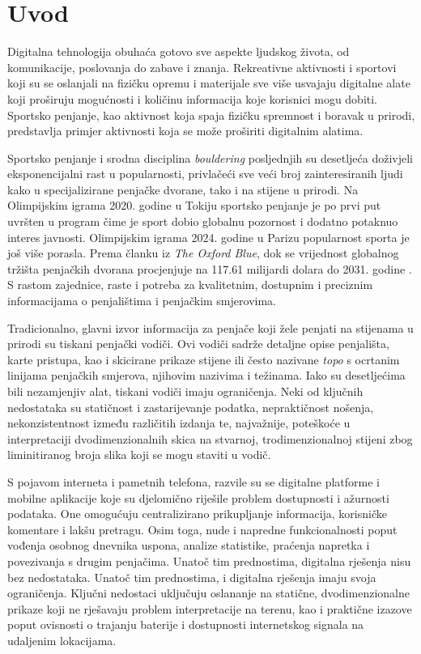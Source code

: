 \chapter{Uvod}

Digitalna tehnologija obuhaća gotovo sve aspekte ljudskog života, od komunikacije, poslovanja do zabave i znanja. Rekreativne aktivnosti i sportovi koji su se oslanjali na fizičku opremu i materijale sve više usvajaju digitalne alate koji proširuju mogućnosti i količinu informacija koje korisnici mogu dobiti. Sportsko penjanje, kao aktivnost koja spaja fizičku spremnost i boravak u prirodi, predstavlja primjer aktivnosti koja se može proširiti digitalnim alatima.

Sportsko penjanje i srodna disciplina \textit{bouldering} posljednjih su desetljeća doživjeli eksponencijalni rast u popularnosti, privlačeći sve veći broj zainteresiranih ljudi kako u specijalizirane penjačke dvorane, tako i na stijene u prirodi. Na Olimpijskim igrama 2020. godine u Tokiju sportsko penjanje je po prvi put uvršten u program čime je sport dobio globalnu pozornost i dodatno potaknuo interes javnosti. Olimpijskim igrama 2024. godine u Parizu popularnost sporta je još više porasla. Prema članku iz \textit{The Oxford Blue}, dok se vrijednost globalnog tržišta penjačkih dvorana procjenjuje na 117.61 milijardi dolara do 2031. godine \cite{the_oxford_blue_rock_climb}. S rastom zajednice, raste i potreba za kvalitetnim, dostupnim i preciznim informacijama o penjalištima i penjačkim smjerovima. 

Tradicionalno, glavni izvor informacija za penjače koji žele penjati na stijenama u prirodi su tiskani penjački vodiči. Ovi vodiči sadrže detaljne opise penjališta, karte pristupa, kao i skicirane prikaze stijene ili često nazivane \textit{topo} s ocrtanim linijama penjačkih smjerova, njihovim nazivima i težinama. Iako su desetljećima bili nezamjenjiv alat, tiskani vodiči imaju ograničenja. Neki od ključnih nedostataka su statičnost i zastarijevanje podatka, nepraktičnost nošenja, nekonzistentnost između različitih izdanja te, najvažnije, poteškoće u interpretaciji dvodimenzionalnih skica na stvarnoj, trodimenzionalnoj stijeni zbog liminitiranog broja slika koji se mogu staviti u vodič.

S pojavom interneta i pametnih telefona, razvile su se digitalne platforme i mobilne aplikacije koje su djelomično riješile problem dostupnosti i ažurnosti podataka. One omogućuju centralizirano prikupljanje informacija, korisničke komentare i lakšu pretragu. Osim toga, nude i napredne funkcionalnosti poput vođenja osobnog dnevnika uspona, analize statistike, praćenja napretka i povezivanja s drugim penjačima.
Unatoč tim prednostima, digitalna rješenja nisu bez nedostataka. Unatoč tim prednostima, i digitalna rješenja imaju svoja ograničenja. Ključni nedostaci uključuju oslananje na statične, dvodimenzionalne prikaze koji ne rješavaju problem interpretacije na terenu, kao i praktične izazove poput ovisnosti o trajanju baterije i dostupnosti internetskog signala na udaljenim lokacijama.

